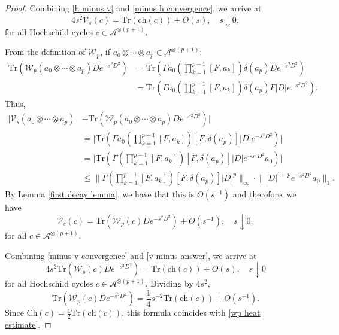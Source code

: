 \begin{proof}
        Combining \eqref{h minus v} and \eqref{minus h convergence}, we arrive at
        \begin{equation}\label{minus v convergence}
            4s^2\mathcal{V}_s(c) = \mathrm{Tr}(\mathrm{ch}(c))+O(s),\quad s\downarrow0,
        \end{equation}
        for all Hochschild cycles $c\in\mathcal{A}^{\otimes (p+1)}.$

        From the definition of $\mathcal{W}_p$, if $a_0\otimes \cdots \otimes a_p \in \mathcal{A}^{\otimes (p+1)}$:
        \begin{align*}
            \mathrm{Tr}(\mathcal{W}_p(a_0\otimes\cdots\otimes a_p)De^{-s^2D^2}) &= \mathrm{Tr}(\Gamma a_0\left(\prod_{k=1}^{p-1}[F,a_k]\right)\delta(a_p)De^{-s^2D^2})\\
                                                                &= \mathrm{Tr}(\Gamma a_0\left(\prod_{k=1}^{p-1}[F,a_k]\right)\delta(a_p)F|D|e^{-s^2D^2}).
        \end{align*}
        Thus,
        \begin{align*}
            \Big|\mathcal{V}_s(a_0\otimes\cdots\otimes a_p)&-\mathrm{Tr}(\mathcal{W}_p(a_0\otimes\cdots\otimes a_p)De^{-s^2D^2})\Big| \\
                                                   &= \Big|\mathrm{Tr}(\Gamma a_0\left(\prod_{k=1}^{p-1}[F,a_k]\right)[F,\delta(a_p)]|D|e^{-s^2D^2})\Big|\\
                                                   &= \Big|\mathrm{Tr}(\Gamma \left(\prod_{k=1}^{p-1}[F,a_k]\right)[F,\delta(a_p)]|D|e^{-s^2D^2}a_0)\Big|\\
                                                   &\leq \Big\|\Gamma \left(\prod_{k=1}^{p-1}[F,a_k]\right)[F,\delta(a_p)]|D|^p\Big\|_{\infty}\cdot\Big\||D|^{1-p}e^{-s^2D^2}a_0\Big\|_1.
        \end{align*}
        By Lemma \ref{first decay lemma}, we have that this is $O(s^{-1})$ and therefore, we have
        \begin{equation}\label{v minus answer}
        \mathcal{V}_s(c)=\mathrm{Tr}(\mathcal{W}_p(c)De^{-s^2D^2})+O(s^{-1}),\quad s\downarrow0,
        \end{equation}
        for all $c\in\mathcal{A}^{\otimes (p+1)}.$

        Combining \eqref{minus v convergence} and \eqref{v minus answer}, we arrive at
        \begin{equation*}
            4s^2\mathrm{Tr}(\mathcal{W}_p(c)De^{-s^2D^2})=\mathrm{Tr}(\mathrm{ch}(c))+O(s),\quad s\downarrow0
        \end{equation*}
        for all Hochschild cycles $c\in\mathcal{A}^{\otimes (p+1)}.$ Dividing by $4s^2$,
        \begin{equation*}
            \mathrm{Tr}(\mathcal{W}_p(c)De^{-s^2D^2}) = \frac{1}{4}s^{-2}\mathrm{Tr}(\mathrm{ch}(c))+O(s^{-1}).
        \end{equation*}        
        Since $\mathrm{Ch}(c) = \frac{1}{2}\mathrm{Tr}(\mathrm{ch}(c))$, this formula coincides with \eqref{wp heat estimate}.
    \end{proof}
    
